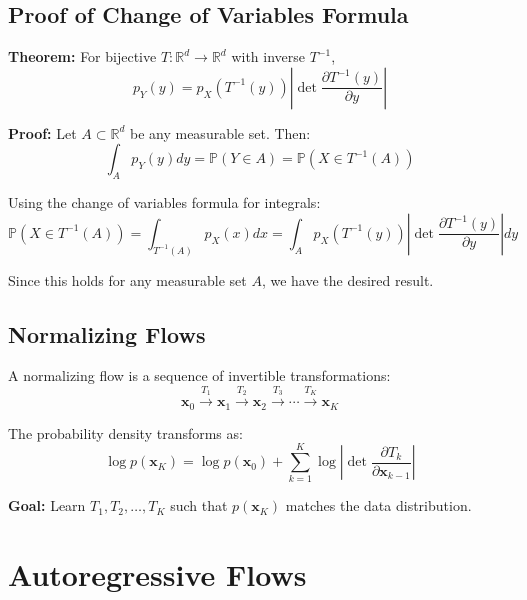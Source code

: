 \subsection{Proof of Change of Variables Formula}

\textbf{Theorem:} For bijective $T: \mathbb{R}^d \to \mathbb{R}^d$ with inverse $T^{-1}$,
\begin{equation}
    p_Y(y) = p_X(T^{-1}(y)) \left|\det \frac{\partial T^{-1}(y)}{\partial y}\right|
\end{equation}

\textbf{Proof:} Let $A \subset \mathbb{R}^d$ be any measurable set. Then:
\begin{equation}
    \int_A p_Y(y) dy = \mathbb{P}(Y \in A) = \mathbb{P}(X \in T^{-1}(A))
\end{equation}

Using the change of variables formula for integrals:
\begin{equation}
    \mathbb{P}(X \in T^{-1}(A)) = \int_{T^{-1}(A)} p_X(x) dx = \int_A p_X(T^{-1}(y)) \left|\det \frac{\partial T^{-1}(y)}{\partial y}\right| dy
\end{equation}

Since this holds for any measurable set $A$, we have the desired result.

\subsection{Normalizing Flows}

A normalizing flow is a sequence of invertible transformations:
\begin{equation}
    \mathbf{x}_0 \xrightarrow{T_1} \mathbf{x}_1 \xrightarrow{T_2} \mathbf{x}_2 \xrightarrow{T_3} \cdots \xrightarrow{T_K} \mathbf{x}_K
\end{equation}

The probability density transforms as:
\begin{equation}
    \log p(\mathbf{x}_K) = \log p(\mathbf{x}_0) + \sum_{k=1}^K \log \left|\det \frac{\partial T_k}{\partial \mathbf{x}_{k-1}}\right|
\end{equation}

\textbf{Goal:} Learn $T_1, T_2, \ldots, T_K$ such that $p(\mathbf{x}_K)$ matches the data distribution.

\section{Autoregressive Flows}

